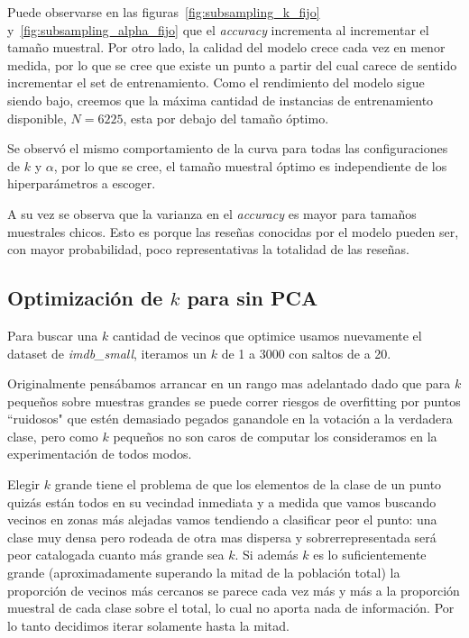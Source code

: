 %
Puede observarse en las figuras~\ref{fig:subsampling_k_fijo}
y~\ref{fig:subsampling_alpha_fijo} que el \textit{accuracy} incrementa al
incrementar el tamaño muestral.  Por otro lado, la calidad del modelo crece
cada vez en menor medida, por lo que se cree que existe un punto a partir del
cual carece de sentido incrementar el set de entrenamiento. Como el rendimiento
del modelo sigue siendo bajo, creemos que la máxima cantidad de instancias de
entrenamiento disponible, $N = 6225$, esta por debajo del tamaño óptimo.

%
Se observó el mismo comportamiento de la curva para todas las configuraciones
de $k$ y $\alpha$, por lo que se cree, el tamaño muestral óptimo es
independiente de los hiperparámetros a escoger.

%
A su vez se observa que la varianza en el \textit{accuracy} es mayor para
tamaños muestrales chicos. Esto es porque las reseñas conocidas por el modelo
pueden ser, con mayor probabilidad, poco representativas la totalidad de las
reseñas.

\subsection{Optimización de $k$ para \knn{} sin PCA}%
\label{sub:knn_sin_pca}

Para buscar una $k$ cantidad de vecinos que optimice \knn{} usamos nuevamente el dataset de \textit{imdb\_small}, iteramos un $k$ de 1 a 3000 con saltos de a 20.

Originalmente pensábamos arrancar en un rango mas adelantado dado que para $k$ pequeños sobre muestras grandes se puede correr riesgos de overfitting por puntos ``ruidosos" que estén demasiado pegados ganandole en la votación a la verdadera clase, pero como $k$ pequeños no son caros de computar los consideramos en la experimentación de todos modos.

Elegir $k$ grande tiene el problema de que los elementos de la clase de un punto quizás están todos en su vecindad inmediata y a medida que vamos buscando vecinos en zonas más alejadas vamos tendiendo a clasificar peor el punto: una clase muy densa pero rodeada de otra mas dispersa y sobrerrepresentada será peor catalogada cuanto más grande sea $k$. Si además $k$ es lo suficientemente grande (aproximadamente superando la mitad de la población total) la proporción de vecinos más cercanos se parece cada vez más y más a la proporción muestral de cada clase sobre el total, lo cual no aporta nada de información. Por lo tanto decidimos iterar solamente hasta la mitad.


